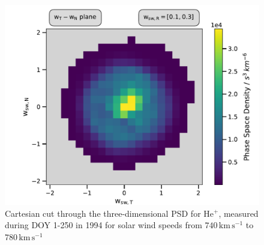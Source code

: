\begin{figure}[h]
	\includegraphics[width=.85\textwidth]{Figures/cart_long_ps.pdf}
	\centering
	\caption{Cartesian cut through the three-dimensional PSD for $\mathrm{He^{+}}$, measured during DOY 1-250 in 1994 for solar wind speeds from $740 \, \mathrm{km\,s^{-1}}$ to $780 \, \mathrm{km\,s^{-1}}$}
	\label{fig:psd_lang}
\end{figure}
%
%
%
%
%
\clearpage
